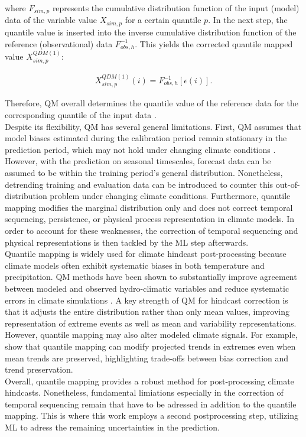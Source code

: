 \documentclass[ba-lentz.tex]{subfile}
\begin{document}
where $F_{sim, p}$ represents the cumulative distribution function of the input (model) data of the variable value $X_{sim, p}$ for a certain quantile $p$.
In the next step, the quantile value is inserted into the inverse cumulative distribution function of the reference (observational) data $F^{-1}_{obs, h}$.
This yields the corrected quantile mapped value $X^{QDM (1)}_{sim, p}$:

\begin{align}
    X^{QDM(1)}_{sim, p} (i) = F^{-1}_{obs, h} [\epsilon (i)] .
\end{align}

Therefore, QM overall determines the quantile value of the reference data for the corresponding quantile of the input data \parencite{schwertfeger_python_2023}. \\

Despite its flexibility, QM has several general limitations.
First, QM assumes that model biases estimated during the calibration period remain stationary in the prediction period, which may not hold under changing climate conditions \parencite{cannon_bias_2015}.
However, with the prediction on seasonal timescales, forecast data can be assumed to be within the training period's general distribution.
Nonetheless, detrending training and evaluation data can be introduced to counter this out-of-distribution problem under changing climate conditions.
Furthermore, quantile mapping modifies the marginal distribution only and does not correct temporal sequencing, persistence, or physical process representation in climate models.
In order to account for these weaknesses, the correction of temporal sequencing and physical representations is then tackled by the ML step afterwards. \\
Quantile mapping is widely used for climate hindcast post-processing because climate models often exhibit systematic biases in both temperature and precipitation.
QM methods have been shown to substantially improve agreement between modeled and observed hydro-climatic variables and reduce systematic errors in climate simulations \parencite{enayati_bias_2021}.
A key strength of QM for hindcast correction is that it adjusts the entire distribution rather than only mean values, improving representation of extreme events as well as mean and variability representations.
However, quantile mapping may also alter modeled climate signals.
For example, \cite{cannon_bias_2015} show that quantile mapping can modify projected trends in extremes even when mean trends are preserved, highlighting trade-offs between bias correction and trend preservation. \\
Overall, quantile mapping provides a robust method for post-processing climate hindcasts.
Nonetheless, fundamental limiations especially in the correction of temporal sequencing remain that have to be adressed in addition to the quantile mapping.
This is where this work employs a second postprocessing step, utilizing ML to adress the remaining uncertainties in the prediction.
\end{document}
